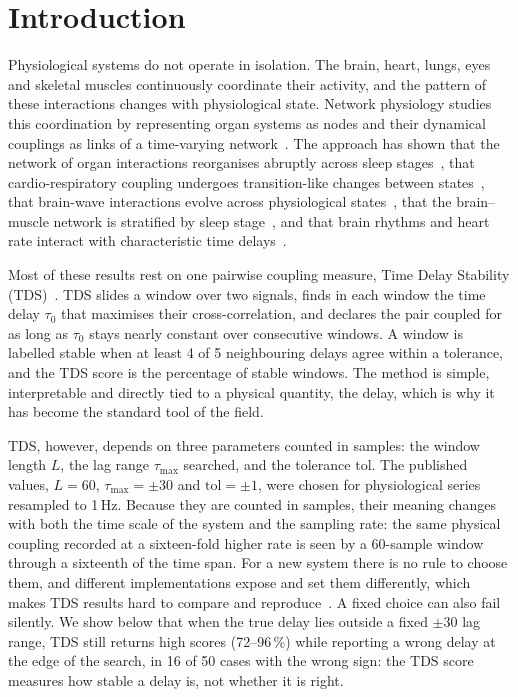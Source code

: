 \documentclass[11pt,a4paper]{article}
\begin{document}
\section{Introduction}
\label{sec:intro}
Physiological systems do not operate in isolation. The brain, heart, lungs, eyes and skeletal muscles continuously coordinate their activity, and the pattern of these interactions changes with physiological state. Network physiology studies this coordination by representing organ systems as nodes and their dynamical couplings as links of a time-varying network~\cite{Bashan2012NetworkPhysiology,Bartsch2015NetworkPhysiology,Ivanov2021NewField}. The approach has shown that the network of organ interactions reorganises abruptly across sleep stages~\cite{Bashan2012NetworkPhysiology,Bartsch2015NetworkPhysiology}, that cardio-respiratory coupling undergoes transition-like changes between states~\cite{Bartsch2012PhaseTransitions}, that brain-wave interactions evolve across physiological states~\cite{Liu2015PlasticityBrain,Liu2015MajorComponent}, that the brain--muscle network is stratified by sleep stage~\cite{Rizzo2020NetworkPhysiology,Rizzo2022DynamicNetworks}, and that brain rhythms and heart rate interact with characteristic time delays~\cite{Lin2016DelaycorrelationLandscape}.

Most of these results rest on one pairwise coupling measure, Time Delay Stability (TDS)~\cite{Bashan2012NetworkPhysiology,Bartsch2015NetworkPhysiology}. TDS slides a window over two signals, finds in each window the time delay $\tau_0$ that maximises their cross-correlation, and declares the pair coupled for as long as $\tau_0$ stays nearly constant over consecutive windows. A window is labelled stable when at least 4 of 5 neighbouring delays agree within a tolerance, and the TDS score is the percentage of stable windows. The method is simple, interpretable and directly tied to a physical quantity, the delay, which is why it has become the standard tool of the field.

TDS, however, depends on three parameters counted in samples: the window length $L$, the lag range $\tau_{\max}$ searched, and the tolerance $\mathrm{tol}$. The published values, $L = 60$, $\tau_{\max} = \pm 30$ and $\mathrm{tol} = \pm 1$, were chosen for physiological series resampled to 1\,Hz. Because they are counted in samples, their meaning changes with both the time scale of the system and the sampling rate: the same physical coupling recorded at a sixteen-fold higher rate is seen by a 60-sample window through a sixteenth of the time span. For a new system there is no rule to choose them, and different implementations expose and set them differently, which makes TDS results hard to compare and reproduce~\cite{Steinbrinker2024TdspyOpensource}. A fixed choice can also fail silently. We show below that when the true delay lies outside a fixed $\pm30$ lag range, TDS still returns high scores (72--96\,\%) while reporting a wrong delay at the edge of the search, in 16 of 50 cases with the wrong sign: the TDS score measures how stable a delay is, not whether it is right.
\end{document}
